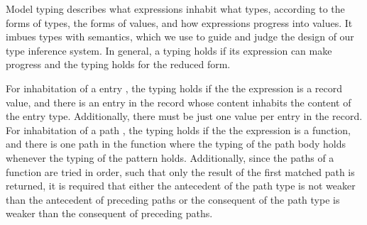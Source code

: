 \documentclass[table,dvipsnames,acmsmall]{acmart}
\theoremstyle{definition}
\begin{document}



\noindent
Model typing describes what expressions inhabit what types,
according to the forms of types, the forms of values, and how expressions
progress into values. 
It imbues types with semantics, which we use
to guide and judge the design of our type inference system. 
In general, a typing holds if its expression can make progress and 
the typing holds for the reduced form.

For inhabitation of a entry ,
the typing holds if the the expression is a record value, and
there is an entry in the record whose content inhabits     
the content of the entry type. Additionally, there must be just one
value per entry in the record. 
For inhabitation of a path 
,
the typing holds if the the expression is a function,
and there is one path in the function where 
the typing of the path body holds whenever the typing of the pattern holds.   
Additionally, since the paths of a function are tried in order, such that 
only the result of the first matched path is returned,
it is required that either the antecedent of the path type
is not weaker than the antecedent of preceding paths 
or the consequent of the path type is weaker than the consequent
of preceding paths. 
\end{document}

